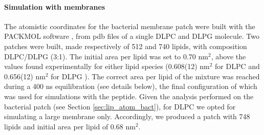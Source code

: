 

\paragraph{Simulation with membranes} The atomistic coordinates for the bacterial membrane patch were built with the PACKMOL software \citep{Martinez2009}, from pdb files of a single DLPC \citep{PogerOrig} and DLPG \citep{Kukol2009} molecule. Two patches were built, made respectively of 512 and 740 lipids, with composition DLPC/DLPG (3:1). The initial area per lipid was set to 0.70 nm$^2$, above the values found experimentally for either lipid species (0.608(12) nm$^2$ for DLPC \citep{Kucerka2011} and 0.656(12) nm$^2$ for DLPG \citep{Pan2012}). The correct area per lipid of the mixture was reached during a 400 ns equilibration (see details below), the final configuration of which was used for simulations with the peptide.
Given the analysis performed on the bacterial patch (see Section \ref{sec:lip_atom_bact}), for DLPC we opted for simulating a large membrane only. Accordingly, we produced a patch with 748 lipids and initial area per lipid of 0.68 nm$^2$.

